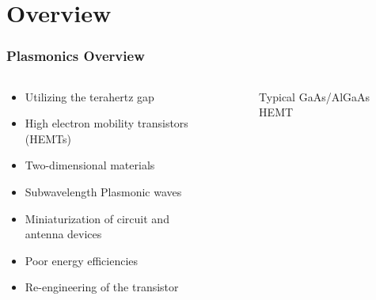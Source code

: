 \documentclass[mathserif,18pt,xcolor=table]{beamer}
\begin{document}
\section{Overview}
\begin{frame}
  \frametitle{Plasmonics Overview}
  \begin{columns} %
    \begin{column}{.5\textwidth}
      \begin{itemize}
        \item Utilizing the terahertz gap
        \item High electron mobility transistors (HEMTs)
        \item Two-dimensional materials
        \item Subwavelength Plasmonic waves
        \item Miniaturization of circuit and antenna devices
        \item Poor energy efficiencies
        \item Re-engineering of the transistor
      \end{itemize}
    \end{column}
    \begin{column}{.5\textwidth}
      \begin{figure}
        \hspace*{-1cm}
        \def\svgwidth{1.2\linewidth}
        
        \caption{Typical GaAs/AlGaAs HEMT}
      \end{figure}
      \end{column}%
    \end{columns}
  \end{frame}
\end{document}

